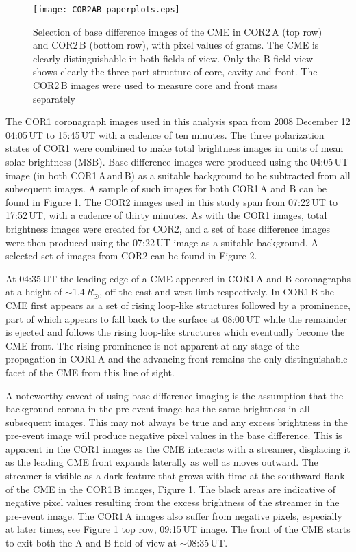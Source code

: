 \documentclass{emulateapj}
\begin{document}
\begin{figure}
\texttt{[image: COR2AB\_paperplots.eps]}
\caption {Selection of base difference images of the CME in COR2\,A (top row) and COR2\,B (bottom row), with pixel values of grams. The CME is clearly distinguishable in both fields of view. Only the B field view shows clearly the three part structure of core, cavity and front. The COR2\,B images were used to measure core and front mass separately}
\label{fig:STEREO_COR1A&B.png}
\end{figure}

The COR1 coronagraph images used in this analysis span from 2008 December 12 04:05\,UT to 15:45\,UT with a cadence of ten minutes. The three polarization states of COR1 were combined to make total brightness images in units of mean solar brightness (MSB). 
Base difference images were produced using the 04:05\,UT image (in both COR1\,A\,and\,B) as a suitable background to be subtracted from all subsequent images. A sample of such images for both COR1\,A and B can be found in Figure 1. The COR2 images used in this study span from 07:22\,UT to 17:52\,UT, with a cadence of thirty minutes. As with the COR1 images, total brightness images were created for COR2, and a set of base difference images were then produced using the 07:22\,UT image as a suitable background. A selected set of images from COR2 can be found in Figure 2. 

	At 04:35\,UT the leading edge of a CME appeared in COR1\,A and B coronagraphs at a height of $\sim$1.4\,$R_{\odot}$, off the east and west limb respectively. In COR1\,B the CME first appears as a set of rising loop-like structures followed by a prominence, part of which appears to fall back to the surface at 08:00\,UT while the remainder is ejected and follows the rising loop-like structures which eventually become the CME front. The rising prominence is not apparent at any stage of the propagation in COR1\,A and the advancing front remains the only distinguishable facet of the CME from this line of sight.
		
A noteworthy caveat of using base difference imaging is the assumption that the background corona in the pre-event image has the same brightness in all subsequent images. This may not always be true and any excess brightness in the pre-event image will produce negative pixel values in the base difference. This is apparent in the COR1 images as the CME interacts with a streamer, displacing it as the leading CME front expands laterally as well as moves outward. The streamer is visible as a dark feature that grows with time at the southward flank of the CME in the COR1\,B images, Figure 1. The black areas are indicative of negative pixel values resulting from the excess brightness of the streamer in the pre-event image. The COR1\,A images also suffer from negative pixels, especially at later times, see Figure 1 top row, 09:15\,UT image. The front of the CME starts to exit both the A and B field of view at $\sim$08:35\,UT.
	
\end{document}
